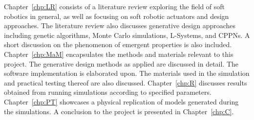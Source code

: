 Chapter~\ref{chp:LR} consists of a literature review exploring the field of soft robotics in general, as well as focusing on soft robotic actuators and design approaches. The literature review also discusses generative design approaches including genetic algorithms, Monte Carlo simulations, L-Systems, and CPPNs. A short discussion on the phenomenon of emergent properties is also included. Chapter~\ref{chp:MaM} encapsulates the methods and materials relevant to this project. The generative design methods as applied are discussed in detail. The software implementation is elaborated upon. The materials used in the simulation and practical testing thereof are also discussed. Chapter~\ref{chp:R} discusses results obtained from running simulations according to specified parameters. Chapter~\ref{chp:PT} showcases a physical replication of models generated during the simulations. A conclusion to the project is presented in Chapter~\ref{chp:C}.